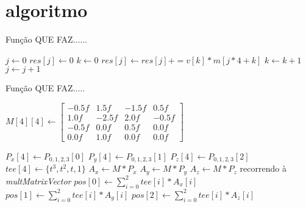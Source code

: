 \section{algoritmo}



\begin{algorithm}
\caption{Função QUE FAZ......}
\label{alg:ssec2:leitura} 
\footnotesize %
\begin{algorithmic}[1]
\State $j\gets 0$
\State $res[j]\gets 0$ 
\State $k\gets 0$
\State $res[j]\gets res[j] += v[k] * m[j * 4 + k]$ 
\State $k\gets k+1$
\EndWhile
\State $j\gets j+1$
\EndWhile
\end{algorithmic}
\end{algorithm}



\begin{algorithm}
\caption{Função QUE FAZ.....}
\label{alg:ssec2:leitura} 
\footnotesize %
\begin{algorithmic}[1]
\State $M[4][4]\gets  \begin{bmatrix}
		       -0.5f & 1.5f & -1.5f  & 0.5f           \\[0.3em]
		        1.0f & -2.5f &  2.0f & -0.5f   \\[0.3em]
		       -0.5f & 0.0f & 0.5f & 0.0f \\[0.3em]
		       0.0f & 1.0f & 0.0f & 0.0f   
		     \end{bmatrix}$ 
		     
\State $P_{x}[4] \gets P_{0,1,2,3}[0]$ 
\State $P_{y}[4] \gets P_{0,1,2,3}[1]$ 
\State $P_{z}[4] \gets P_{0,1,2,3}[2]$ 
\State $tee[4] \gets \{t^{3},t^{2},t,1\}$ 
\State $A_{x} \gets M*P_{x} $
\State $A_{y} \gets M*P_{y} $
\State $A_{z} \gets M*P_{z} $   recorrendo à \textit{multMatrixVector} 
\State $pos[0] \gets \sum_{i=0}^{2}tee[i]*A_{x}[i] $
\State $pos[1] \gets \sum_{i=0}^{2}tee[i]*A_{y}[i] $
\State $pos[2] \gets \sum_{i=0}^{2}tee[i]*A_{z}[i] $  
\end{algorithmic}
\end{algorithm}



